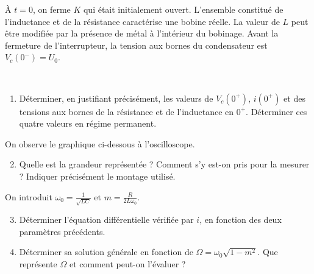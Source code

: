 \begin{minipage}[t]{0.6\textwidth} %

À $t = 0$, on ferme $K$ qui était initialement ouvert. L'ensemble constitué de l'inductance et de la résistance caractérise une bobine réelle. La valeur de $L$ peut être modifiée par la présence de métal à l'intérieur du bobinage. Avant la fermeture de l'interrupteur, la tension aux bornes du condensateur est $V_c(0^-) = U_0$.

\end{minipage}
\hfill %
\begin{minipage}[t]{0.35\textwidth} %
~
\vspace{-2em}


\end{minipage}


\begin{enumerate}
    \item Déterminer, en justifiant précisément, les valeurs de $V_c(0^+)$, $i(0^+)$ et des tensions aux bornes de la résistance et de l'inductance en $0^+$. Déterminer ces quatre valeurs en régime permanent.
\end{enumerate}

On observe le graphique ci-dessous à l'oscilloscope.

\begin{center}
\end{center}

\begin{enumerate}
    \setcounter{enumi}{1}
    \item Quelle est la grandeur représentée ? Comment s'y est-on pris pour la mesurer ? Indiquer précisément le montage utilisé.
\end{enumerate}

On introduit $\omega_0 = \frac{1}{\sqrt{LC}}$ et $m = \frac{R}{2L\omega_0}$.

\begin{enumerate}
    \setcounter{enumi}{2}
    \item Déterminer l'équation différentielle vérifiée par $i$, en fonction des deux paramètres précédents.
    \item Déterminer sa solution générale en fonction de $\Omega = \omega_0\sqrt{1 - m^2}$. Que représente $\Omega$ et comment peut-on l'évaluer ?
\end{enumerate}

